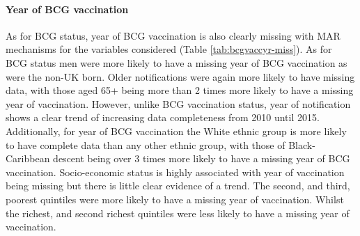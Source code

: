 \documentclass[11pt,twoside]{bristolthesis}
\begin{document}
  \hypertarget{year-of-bcg-vaccination}{%
  \paragraph{Year of BCG vaccination}\label{year-of-bcg-vaccination}}
  
  As for BCG status, year of BCG vaccination is also clearly missing with MAR mechanisms for the variables considered (Table \ref{tab:bcgvaccyr-miss}). As for BCG status men were more likely to have a missing year of BCG vaccination as were the non-UK born. Older notifications were again more likely to have missing data, with those aged 65+ being more than 2 times more likely to have a missing year of vaccination. However, unlike BCG vaccination status, year of notification shows a clear trend of increasing data completeness from 2010 until 2015. Additionally, for year of BCG vaccination the White ethnic group is more likely to have complete data than any other ethnic group, with those of Black-Caribbean descent being over 3 times more likely to have a missing year of BCG vaccination. Socio-economic status is highly associated with year of vaccination being missing but there is little clear evidence of a trend. The second, and third, poorest quintiles were more likely to have a missing year of vaccination. Whilst the richest, and second richest quintiles were less likely to have a missing year of vaccination.
  
\end{document}
